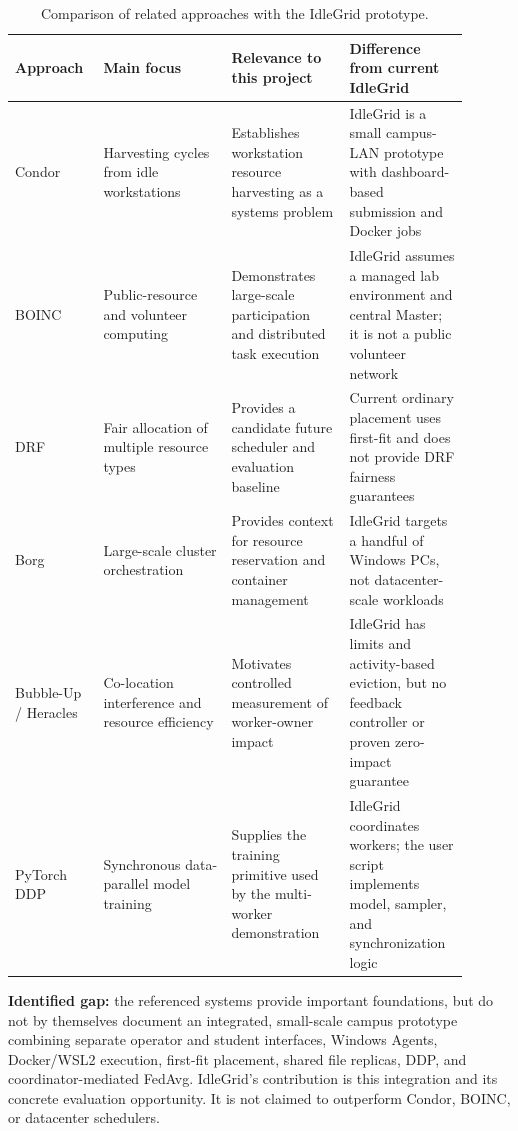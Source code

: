 \documentclass{article}
\begin{document}
\begin{table}[h!]
\centering
\caption{Comparison of related approaches with the IdleGrid prototype.}
\label{tab:related-work}
\begin{tabular}{|p{0.16\linewidth}|p{0.26\linewidth}|p{0.24\linewidth}|p{0.24\linewidth}|}
\hline
Approach & Main focus & Relevance to this project & Difference from current IdleGrid \\
\hline
Condor \cite{condor} & Harvesting cycles from idle workstations & Establishes workstation resource harvesting as a systems problem & IdleGrid is a small campus-LAN prototype with dashboard-based submission and Docker jobs \\
\hline
BOINC \cite{boinc} & Public-resource and volunteer computing & Demonstrates large-scale participation and distributed task execution & IdleGrid assumes a managed lab environment and central Master; it is not a public volunteer network \\
\hline
DRF \cite{drf} & Fair allocation of multiple resource types & Provides a candidate future scheduler and evaluation baseline & Current ordinary placement uses first-fit and does not provide DRF fairness guarantees \\
\hline
Borg \cite{borg} & Large-scale cluster orchestration & Provides context for resource reservation and container management & IdleGrid targets a handful of Windows PCs, not datacenter-scale workloads \\
\hline
Bubble-Up / Heracles \cite{bubbleup,heracles} & Co-location interference and resource efficiency & Motivates controlled measurement of worker-owner impact & IdleGrid has limits and activity-based eviction, but no feedback controller or proven zero-impact guarantee \\
\hline
PyTorch DDP \cite{pytorchddp} & Synchronous data-parallel model training & Supplies the training primitive used by the multi-worker demonstration & IdleGrid coordinates workers; the user script implements model, sampler, and synchronization logic \\
\hline
\end{tabular}
\end{table}

\textbf{Identified gap:} the referenced systems provide important foundations, but do not by themselves document an integrated, small-scale campus prototype combining separate operator and student interfaces, Windows Agents, Docker/WSL2 execution, first-fit placement, shared file replicas, DDP, and coordinator-mediated FedAvg. IdleGrid's contribution is this integration and its concrete evaluation opportunity. It is not claimed to outperform Condor, BOINC, or datacenter schedulers.
\end{document}
